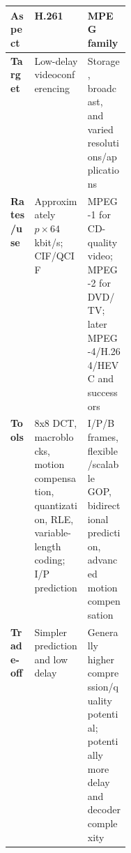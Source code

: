 \documentclass[11pt,a4paper]{article}
\begin{document}
\begin{center}
\begin{tabularx}{\linewidth}{>{\bfseries}p{0.2\linewidth}XX}
\toprule
Aspect & H.261 & MPEG family\\
\midrule
Target & Low-delay videoconferencing & Storage, broadcast, and varied resolutions/applications\\
Rates/use & Approximately \(p\times64\) kbit/s; CIF/QCIF & MPEG-1 for CD-quality video; MPEG-2 for DVD/TV; later MPEG-4/H.264/HEVC and successors\\
Tools & 8x8 DCT, macroblocks, motion compensation, quantization, RLE, variable-length coding; I/P prediction & I/P/B frames, flexible/scalable GOP, bidirectional prediction, advanced motion compensation\\
Trade-off & Simpler prediction and low delay & Generally higher compression/quality potential; potentially more delay and decoder complexity\\
\bottomrule
\end{tabularx}
\end{center}
\end{document}
